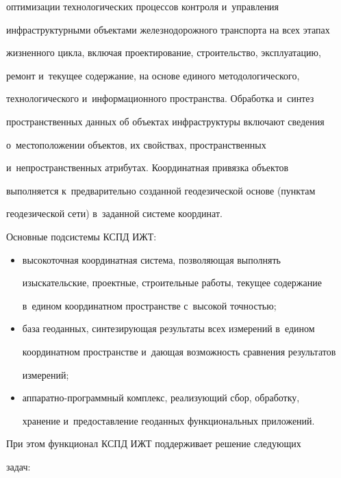 оптимизации технологических процессов контроля и~управ\-ле\-ния 


инфраструктурными объектами железнодорожного транс\-пор\-та на всех этапах 


жизненного цик\-ла, вклю\-чая проектирование, строительство, эксплуатацию, 


ремонт и~текущее содержание, на основе единого методологического, 


технологического и~информационного пространства. Обработка и~синтез 


пространственных данных об объектах инфраструктуры включают сведения 


о~мес\-то\-по\-ло\-же\-нии объектов, их свойствах, пространственных 


и~непространственных атрибутах. Координатная привязка объектов 


выполняется к~предварительно созданной геодезической основе (пунктам 


геодезической сети) в~заданной сис\-те\-ме координат.


  


  Основные подсистемы КСПД ИЖТ:


  \begin{itemize}


\item высокоточная координатная система, поз\-во\-ля\-ющая выполнять 


изыскательские, проектные, строительные работы, текущее содержание 


в~едином координатном пространстве с~высокой точ\-ностью;


\item база геоданных, син\-те\-зи\-ру\-ющая результаты всех измерений в~едином 


координатном про\-странст\-ве и~дающая воз\-мож\-ность сравнения результатов 


измерений;


\item аппаратно-программный комплекс, реализующий сбор, обработку, 


хранение и~предостав\-ле\-ние геоданных функциональных приложений.


      \end{itemize}




     При этом функционал КСПД ИЖТ поддерживает решение следующих 


задач:


